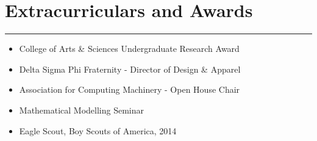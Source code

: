 \documentclass[11pt]{article}
\newcommand{\resumesection}[1]{\vspace{-0.2cm}\section*{#1}\vspace{-0.2cm}\hrule\vspace{0.2cm}}
\begin{document}
\resumesection{Extracurriculars and Awards}
\begin{itemize}
	\item College of Arts \& Sciences Undergraduate Research Award
	\item Delta Sigma Phi Fraternity - Director of Design \& Apparel 
	\item Association for Computing Machinery - Open House Chair 
	\item Mathematical Modelling Seminar
	\item Eagle Scout, Boy Scouts of America, 2014
\end{itemize}


\end{document}
